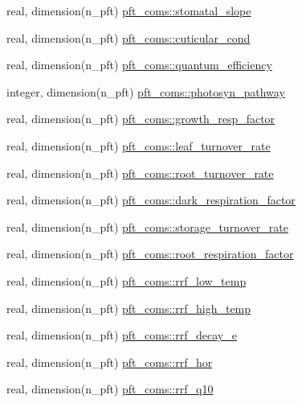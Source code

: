 \begin{DoxyCompactItemize}
real, dimension(n\+\_\+pft) \hyperlink{namespacepft__coms_a36d072c9dc75fed2a29770bb892c0c8d}{pft\+\_\+coms\+::stomatal\+\_\+slope}
\item 
real, dimension(n\+\_\+pft) \hyperlink{namespacepft__coms_a123da989ae706b508ed48db4a138ff8e}{pft\+\_\+coms\+::cuticular\+\_\+cond}
\item 
real, dimension(n\+\_\+pft) \hyperlink{namespacepft__coms_ad1cdaf379a14e627f176105d6d744edb}{pft\+\_\+coms\+::quantum\+\_\+efficiency}
\item 
integer, dimension(n\+\_\+pft) \hyperlink{namespacepft__coms_a697c05e70b11e609bd5316b8eed821ed}{pft\+\_\+coms\+::photosyn\+\_\+pathway}
\item 
real, dimension(n\+\_\+pft) \hyperlink{namespacepft__coms_ae299a7616ce4a71415041f39e6e55d6c}{pft\+\_\+coms\+::growth\+\_\+resp\+\_\+factor}
\item 
real, dimension(n\+\_\+pft) \hyperlink{namespacepft__coms_a3c2cfe5a5095b3617d6ef0eda3088d07}{pft\+\_\+coms\+::leaf\+\_\+turnover\+\_\+rate}
\item 
real, dimension(n\+\_\+pft) \hyperlink{namespacepft__coms_a99860b135721c9298c4a28c8eeaab425}{pft\+\_\+coms\+::root\+\_\+turnover\+\_\+rate}
\item 
real, dimension(n\+\_\+pft) \hyperlink{namespacepft__coms_acd493e3e4371571956c651698a6462b9}{pft\+\_\+coms\+::dark\+\_\+respiration\+\_\+factor}
\item 
real, dimension(n\+\_\+pft) \hyperlink{namespacepft__coms_ac6e0048b175e1bdd410e60c25eddd828}{pft\+\_\+coms\+::storage\+\_\+turnover\+\_\+rate}
\item 
real, dimension(n\+\_\+pft) \hyperlink{namespacepft__coms_a3bc4fe17b80e40b1224d3e46d9699a66}{pft\+\_\+coms\+::root\+\_\+respiration\+\_\+factor}
\item 
real, dimension(n\+\_\+pft) \hyperlink{namespacepft__coms_a87bba89213b158e2aed4dac23565b3d6}{pft\+\_\+coms\+::rrf\+\_\+low\+\_\+temp}
\item 
real, dimension(n\+\_\+pft) \hyperlink{namespacepft__coms_ae05300b2ffecef7671154f099c69e0bb}{pft\+\_\+coms\+::rrf\+\_\+high\+\_\+temp}
\item 
real, dimension(n\+\_\+pft) \hyperlink{namespacepft__coms_a2087ec09afb37705591b08017b2bcb27}{pft\+\_\+coms\+::rrf\+\_\+decay\+\_\+e}
\item 
real, dimension(n\+\_\+pft) \hyperlink{namespacepft__coms_a5fc24fd1652202216904fe39f1a2f318}{pft\+\_\+coms\+::rrf\+\_\+hor}
\item 
real, dimension(n\+\_\+pft) \hyperlink{namespacepft__coms_aadcb3d9b31b09de0ee92c5c0d549ce28}{pft\+\_\+coms\+::rrf\+\_\+q10}

\end{DoxyCompactItemize}
